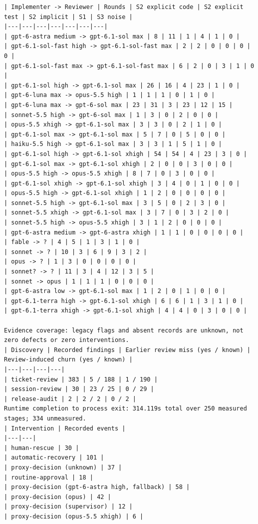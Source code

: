 \documentclass[11pt,a4paper]{article}
\begin{document}
{\begin{verbatim}
| Implementer -> Reviewer | Rounds | S2 explicit code | S2 explicit test | S2 implicit | S1 | S3 noise |
|---|---|---|---|---|---|---|
| gpt-6-astra medium -> gpt-6.1-sol max | 8 | 11 | 1 | 4 | 1 | 0 |
| gpt-6.1-sol-fast high -> gpt-6.1-sol-fast max | 2 | 2 | 0 | 0 | 0 | 0 |
| gpt-6.1-sol-fast max -> gpt-6.1-sol-fast max | 6 | 2 | 0 | 3 | 1 | 0 |
| gpt-6.1-sol high -> gpt-6.1-sol max | 26 | 16 | 4 | 23 | 1 | 0 |
| gpt-6-luna max -> opus-5.5 high | 1 | 1 | 1 | 0 | 1 | 0 |
| gpt-6-luna max -> gpt-6-sol max | 23 | 31 | 3 | 23 | 12 | 15 |
| sonnet-5.5 high -> gpt-6-sol max | 1 | 3 | 0 | 2 | 0 | 0 |
| opus-5.5 xhigh -> gpt-6.1-sol max | 3 | 3 | 0 | 2 | 1 | 0 |
| gpt-6.1-sol max -> gpt-6.1-sol max | 5 | 7 | 0 | 5 | 0 | 0 |
| haiku-5.5 high -> gpt-6.1-sol max | 3 | 3 | 1 | 5 | 1 | 0 |
| gpt-6.1-sol high -> gpt-6.1-sol xhigh | 54 | 54 | 4 | 23 | 3 | 0 |
| gpt-6.1-sol max -> gpt-6.1-sol xhigh | 2 | 0 | 0 | 3 | 0 | 0 |
| opus-5.5 high -> opus-5.5 xhigh | 8 | 7 | 0 | 3 | 0 | 0 |
| gpt-6.1-sol xhigh -> gpt-6.1-sol xhigh | 3 | 4 | 0 | 1 | 0 | 0 |
| opus-5.5 high -> gpt-6.1-sol xhigh | 1 | 2 | 0 | 0 | 0 | 0 |
| sonnet-5.5 high -> gpt-6.1-sol max | 3 | 5 | 0 | 2 | 3 | 0 |
| sonnet-5.5 xhigh -> gpt-6.1-sol max | 3 | 7 | 0 | 3 | 2 | 0 |
| sonnet-5.5 high -> opus-5.5 xhigh | 3 | 1 | 2 | 0 | 0 | 0 |
| gpt-6-astra medium -> gpt-6-astra xhigh | 1 | 1 | 0 | 0 | 0 | 0 |
| fable -> ? | 4 | 5 | 1 | 3 | 1 | 0 |
| sonnet -> ? | 10 | 3 | 6 | 9 | 3 | 2 |
| opus -> ? | 1 | 3 | 0 | 0 | 0 | 0 |
| sonnet? -> ? | 11 | 3 | 4 | 12 | 3 | 5 |
| sonnet -> opus | 1 | 1 | 1 | 0 | 0 | 0 |
| gpt-6-astra low -> gpt-6.1-sol max | 1 | 2 | 0 | 1 | 0 | 0 |
| gpt-6.1-terra high -> gpt-6.1-sol xhigh | 6 | 6 | 1 | 3 | 1 | 0 |
| gpt-6.1-terra xhigh -> gpt-6.1-sol xhigh | 4 | 4 | 0 | 3 | 0 | 0 |

Evidence coverage: legacy flags and absent records are unknown, not zero defects or zero interventions.
| Discovery | Recorded findings | Earlier review miss (yes / known) | Review-induced churn (yes / known) |
|---|---|---|---|
| ticket-review | 383 | 5 / 188 | 1 / 190 |
| session-review | 30 | 23 / 25 | 0 / 29 |
| release-audit | 2 | 2 / 2 | 0 / 2 |
Runtime completion to process exit: 314.119s total over 250 measured stages; 334 unmeasured.
| Intervention | Recorded events |
|---|---|
| human-rescue | 30 |
| automatic-recovery | 101 |
| proxy-decision (unknown) | 37 |
| routine-approval | 18 |
| proxy-decision (gpt-6-astra high, fallback) | 58 |
| proxy-decision (opus) | 42 |
| proxy-decision (supervisor) | 12 |
| proxy-decision (opus-5.5 xhigh) | 6 |
\end{verbatim}
}
\end{document}
